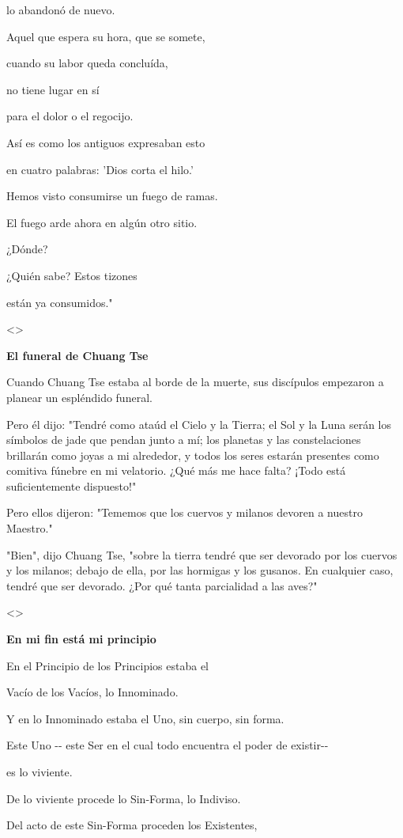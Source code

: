 lo abandonó de nuevo.

Aquel que espera su hora, que se somete,

cuando su labor queda concluída,

no tiene lugar en sí

para el dolor o el regocijo.

Así es como los antiguos expresaban esto

en cuatro palabras: 'Dios corta el hilo.'

Hemos visto consumirse un fuego de ramas.

El fuego arde ahora en algún otro sitio.

¿Dónde?

¿Quién sabe? Estos tizones

están ya consumidos."

\textless\textgreater{}

\textbf{{El funeral de Chuang Tse}}

Cuando Chuang Tse estaba al borde de la muerte, sus discípulos empezaron
a planear un espléndido funeral.

Pero él dijo: "Tendré como ataúd el Cielo y la Tierra; el Sol y la Luna
serán los símbolos de jade que pendan junto a mí; los planetas y las
constelaciones brillarán como joyas a mi alrededor, y todos los seres
estarán presentes como comitiva fúnebre en mi velatorio. ¿Qué más me
hace falta? ¡Todo está suficientemente dispuesto!"

Pero ellos dijeron: "Tememos que los cuervos y milanos devoren a nuestro
Maestro."

"Bien", dijo Chuang Tse, "sobre la tierra tendré que ser devorado por
los cuervos y los milanos; debajo de ella, por las hormigas y los
gusanos. En cualquier caso, tendré que ser devorado. ¿Por qué tanta
parcialidad a las aves?"

\textless\textgreater{}

\textbf{{En mi fin está mi principio}}

En el Principio de los Principios estaba el

Vacío de los Vacíos, lo Innominado.

Y en lo Innominado estaba el Uno, sin cuerpo, sin forma.

Este Uno -\/- este Ser en el cual todo encuentra el poder de existir-\/-

es lo viviente.

De lo viviente procede lo Sin-Forma, lo Indiviso.

Del acto de este Sin-Forma proceden los Existentes,

